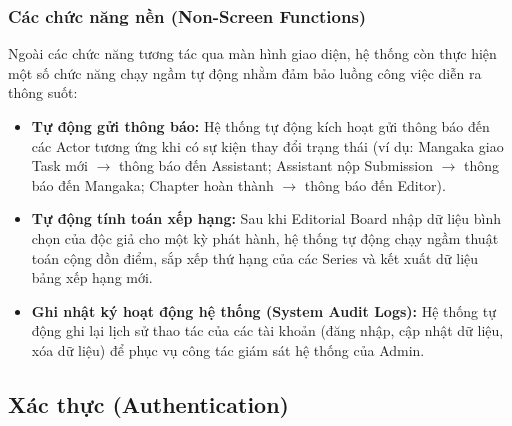 \subsubsection{Các chức năng nền (Non-Screen Functions)}
Ngoài các chức năng tương tác qua màn hình giao diện, hệ thống còn thực hiện một số chức năng chạy ngầm tự động nhằm đảm bảo luồng công việc diễn ra thông suốt:
\begin{itemize}
    \item \textbf{Tự động gửi thông báo:} Hệ thống tự động kích hoạt gửi thông báo đến các Actor tương ứng khi có sự kiện thay đổi trạng thái (ví dụ: Mangaka giao Task mới $\rightarrow$ thông báo đến Assistant; Assistant nộp Submission $\rightarrow$ thông báo đến Mangaka; Chapter hoàn thành $\rightarrow$ thông báo đến Editor).
    \item \textbf{Tự động tính toán xếp hạng:} Sau khi Editorial Board nhập dữ liệu bình chọn của độc giả cho một kỳ phát hành, hệ thống tự động chạy ngầm thuật toán cộng dồn điểm, sắp xếp thứ hạng của các Series và kết xuất dữ liệu bảng xếp hạng mới.
    \item \textbf{Ghi nhật ký hoạt động hệ thống (System Audit Logs):} Hệ thống tự động ghi lại lịch sử thao tác của các tài khoản (đăng nhập, cập nhật dữ liệu, xóa dữ liệu) để phục vụ công tác giám sát hệ thống của Admin.
\end{itemize}

\subsection{Xác thực (Authentication)}
\label{subsec:srs_auth}

